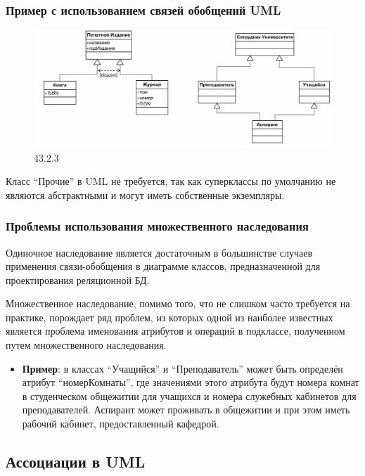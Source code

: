 \documentclass[a4paper,12pt]{article}
\begin{document}
\subsubsection{Пример с использованием связей обобщений UML}


\begin{figure}
    \centering
    \includegraphics[width=0.75\linewidth]{image2.png}
    \caption{43.2.3}
    \label{fig:enter-label}
\end{figure}
Класс ``Прочие'' в UML не требуется, так как суперклассы по умолчанию не являются абстрактными и могут иметь собственные экземпляры.

\subsubsection{Проблемы использования множественного наследования}

Одиночное наследование является достаточным в большинстве случаев применения связи-обобщения в диаграмме классов, предназначенной для проектирования реляционной БД.

Множественное наследование, помимо того, что не слишком часто требуется на практике, порождает ряд проблем, из которых одной из наиболее известных является проблема именования атрибутов и операций в подклассе, полученном путем множественного наследования.

\begin{itemize}
    \item \textbf{Пример}: в классах ``Учащийся'' и ``Преподаватель'' может быть определён атрибут ``номерКомнаты'', где значениями этого атрибута будут номера комнат в студенческом общежитии для учащихся и номера служебных кабинетов для преподавателей. Аспирант может проживать в общежитии и при этом иметь рабочий кабинет, предоставленный кафедрой.
\end{itemize}

\subsection{Ассоциации в UML}
\end{document}
